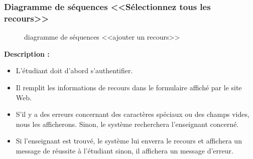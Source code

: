 \documentclass[12pt]{report}
\begin{document}
\newpage

\subsubsection{Diagramme de séquences <<Sélectionnez tous les recours>>}

\begin{figure}[h]
\centering
    \centerline{}
    \caption{diagramme de séquences <<ajouter un recours>>}
\end{figure}

\textbf{Description :}

\begin{itemize}
    \item L'étudiant doit d'abord s'authentifier.
    \item Il remplit les informations de recours dans le formulaire affiché par le site Web.
    \item S'il y a des erreurs concernant des caractères spéciaux ou des champs vides, nous les afficherons. Sinon, le système recherchera l'enseignant concerné.
    \item Si l'enseignant est trouvé, le système lui enverra le recours et affichera un message de réussite à l'étudiant sinon, il affichera un message d'erreur.
\end{itemize}
\end{document}

